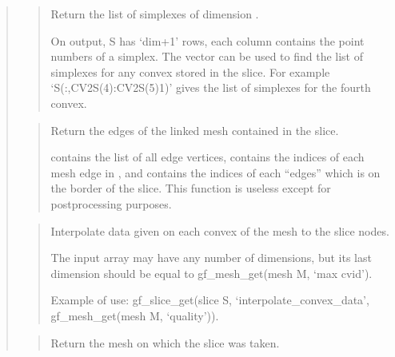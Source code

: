 \documentclass[a4paper,11pt,english]{sphinxmanual}
\begin{document}
\begin{quote}
\sphinxAtStartPar
{}
\begin{quote}

\sphinxAtStartPar
Return the list of simplexes of dimension .

\sphinxAtStartPar
On output, S has ‘dim+1’ rows, each column contains the point
numbers of a simplex.  The vector  can be used to find the
list of simplexes for any convex stored in the slice. For example
‘S(:,CV2S(4):CV2S(5)\sphinxhyphen{}1)’
gives the list of simplexes for the fourth convex.
\end{quote}

\sphinxAtStartPar
{}
\begin{quote}

\sphinxAtStartPar
Return the edges of the linked mesh contained in the slice.

\sphinxAtStartPar
{} contains the list of all edge vertices,  contains
the indices of each mesh edge in , and  contains the
indices of each “edges” which is on the border of the slice.
This function is useless except for post\sphinxhyphen{}processing purposes.
\end{quote}

\sphinxAtStartPar
{}
\begin{quote}

\sphinxAtStartPar
Interpolate data given on each convex of the mesh to the slice nodes.

\sphinxAtStartPar
The input array  may have any number of dimensions, but its
last dimension should be equal to gf\_mesh\_get(mesh M, ‘max cvid’).

\sphinxAtStartPar
Example of use: gf\_slice\_get(slice S, ‘interpolate\_convex\_data’, gf\_mesh\_get(mesh M, ‘quality’)).
\end{quote}

\sphinxAtStartPar
{}
\begin{quote}

\sphinxAtStartPar
Return the mesh on which the slice was taken.
\end{quote}


\end{quote}
\end{document}
